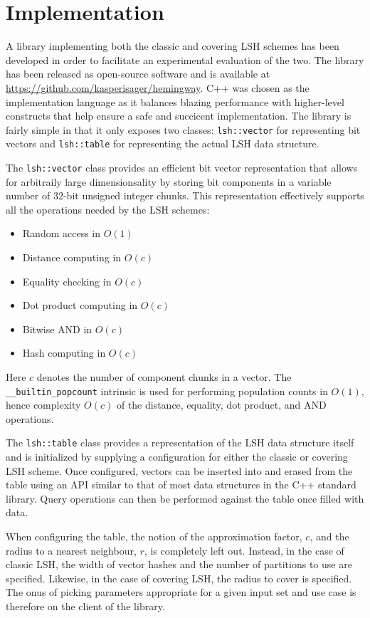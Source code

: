 \section{Implementation}
\label{implementation}

A library implementing both the classic and covering LSH schemes has been developed in order to facilitate an experimental evaluation of the two. The library has been released as open-source software and is available at \url{https://github.com/kasperisager/hemingway}. C++ was chosen as the implementation language as it balances blazing performance with higher-level constructs that help ensure a safe and succicent implementation. The library is fairly simple in that it only exposes two classes: \texttt{lsh::vector} for representing bit vectors and \texttt{lsh::table} for representing the actual LSH data structure.

The \texttt{lsh::vector} class provides an efficient bit vector representation that allows for arbitraily large dimensionsality by storing bit components in a variable number of 32-bit unsigned integer chunks. This representation effectively supports all the operations needed by the LSH schemes:

\begin{itemize}
  \item Random access in $O(1)$
  \item Distance computing in $O(c)$
  \item Equality checking in $O(c)$
  \item Dot product computing in $O(c)$
  \item Bitwise AND in $O(c)$
  \item Hash computing in $O(c)$
\end{itemize}

Here $c$ denotes the number of component chunks in a vector. The \texttt{\_\_builtin\_popcount} intrinsic is used for performing population counts in $O(1)$, hence complexity $O(c)$ of the distance, equality, dot product, and AND operations.

The \texttt{lsh::table} class provides a representation of the LSH data structure itself and is initialized by supplying a configuration for either the classic or covering LSH scheme. Once configured, vectors can be inserted into and erased from the table using an API similar to that of most data structures in the C++ standard library. Query operations can then be performed against the table once filled with data.

When configuring the table, the notion of the approximation factor, $c$, and the radius to a nearest neighbour, $r$, is completely left out. Instead, in the case of classic LSH, the width of vector hashes and the number of partitions to use are specified. Likewise, in the case of covering LSH, the radius to cover is specified. The onus of picking parameters appropriate for a given input set and use case is therefore on the client of the library.
